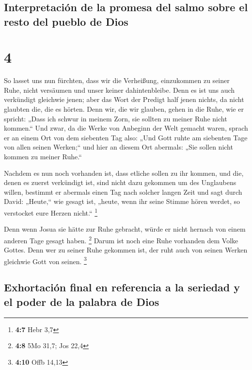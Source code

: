 \hypertarget{interpretaciuxf3n-de-la-promesa-del-salmo-sobre-el-resto-del-pueblo-de-dios}{%
\subsection{Interpretación de la promesa del salmo sobre el resto del
pueblo de
Dios}\label{interpretaciuxf3n-de-la-promesa-del-salmo-sobre-el-resto-del-pueblo-de-dios}}

\hypertarget{section-3}{%
\section{4}\label{section-3}}

 So lasset uns nun fürchten, dass wir die Verheißung,
einzukommen zu seiner Ruhe, nicht versäumen und unser keiner
dahintenbleibe.  Denn es ist uns auch verkündigt gleichwie
jenen; aber das Wort der Predigt half jenen nichts, da nicht glaubten
die, die es hörten.  Denn wir, die wir glauben, gehen in
die Ruhe, wie er spricht: „Dass ich schwur in meinem Zorn, sie sollten
zu meiner Ruhe nicht kommen.`` Und zwar, da die Werke von Anbeginn der
Welt gemacht waren,  sprach er an einem Ort von dem
siebenten Tag also: „Und Gott ruhte am siebenten Tage von allen seinen
Werken;``  und hier an diesem Ort abermals: „Sie sollen
nicht kommen zu meiner Ruhe.``

 Nachdem es nun noch vorhanden ist, dass etliche sollen zu
ihr kommen, und die, denen es zuerst verkündigt ist, sind nicht dazu
gekommen um des Unglaubens willen,  bestimmt er abermals
einen Tag nach solcher langen Zeit und sagt durch David: „Heute,`` wie
gesagt ist, „heute, wenn ihr seine Stimme hören werdet, so verstocket
eure Herzen nicht.`` \footnote{\textbf{4:7} Hebr 3,7}

 Denn wenn Josua sie hätte zur Ruhe gebracht, würde er
nicht hernach von einem anderen Tage gesagt haben. \footnote{\textbf{4:8}
  5Mo 31,7; Jos 22,4}  Darum ist noch eine Ruhe vorhanden
dem Volke Gottes.  Denn wer zu seiner Ruhe gekommen ist,
der ruht auch von seinen Werken gleichwie Gott von seinen. \footnote{\textbf{4:10}
  Offb 14,13}

\hypertarget{exhortaciuxf3n-final-en-referencia-a-la-seriedad-y-el-poder-de-la-palabra-de-dios}{%
\subsection{Exhortación final en referencia a la seriedad y el poder de
la palabra de
Dios}\label{exhortaciuxf3n-final-en-referencia-a-la-seriedad-y-el-poder-de-la-palabra-de-dios}}

